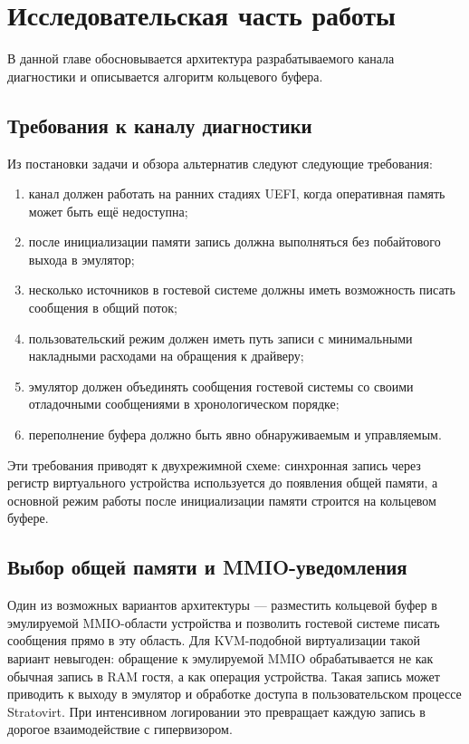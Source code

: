 \section{Исследовательская часть работы}
\label{sec:Chapter2} 

В данной главе обосновывается архитектура разрабатываемого канала диагностики и
описывается алгоритм кольцевого буфера.

\subsection{Требования к каналу диагностики}
\label{sec:ch2-requirements}

Из постановки задачи и обзора альтернатив следуют следующие требования:
\begin{enumerate}
    \item канал должен работать на ранних стадиях UEFI, когда оперативная память
    может быть ещё недоступна;
    \item после инициализации памяти запись должна выполняться без побайтового
    выхода в эмулятор;
    \item несколько источников в гостевой системе должны иметь возможность писать
    сообщения в общий поток;
    \item пользовательский режим должен иметь путь записи с минимальными
    накладными расходами на обращения к драйверу;
    \item эмулятор должен объединять сообщения гостевой системы со своими отладочными сообщениями в
    хронологическом порядке;
    \item переполнение буфера должно быть явно обнаруживаемым и управляемым.
\end{enumerate}

Эти требования приводят к двухрежимной схеме: синхронная запись через регистр
виртуального устройства используется до появления общей памяти, а основной режим
работы после инициализации памяти строится на кольцевом буфере.

\subsection{Выбор общей памяти и MMIO-уведомления}
\label{sec:ch2-shared-memory}

Один из возможных вариантов архитектуры --- разместить кольцевой буфер в
эмулируемой MMIO-области устройства и позволить гостевой системе писать
сообщения прямо в эту область. Для KVM-подобной виртуализации такой вариант
невыгоден: обращение к эмулируемой MMIO обрабатывается не как обычная запись в
RAM гостя, а как операция устройства. Такая запись может приводить к выходу в
эмулятор и обработке доступа в пользовательском процессе Stratovirt. При
интенсивном логировании это превращает каждую запись в дорогое взаимодействие с
гипервизором.

